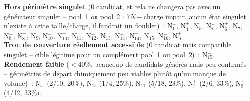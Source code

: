 \textbf{Hors p\'erim\`etre singulet} (0 candidat, et cela ne changera pas avec un g\'en\'erateur singulet -- pool~1 ou pool~2 : $7N-\mathrm{charge}$ impair, aucun \'etat singulet n'existe \`a cette taille/charge, il faudrait un doublet)~: N$_{4}^{-}$, N$_{4}^{+}$, N$_{5}$, N$_{6}^{-}$, N$_{6}^{+}$, N$_{7}$, N$_{8}^{-}$, N$_{8}^{+}$, N$_{9}$, N$_{10}^{-}$, N$_{10}^{+}$, N$_{11}$, N$_{12}^{-}$, N$_{13}$, N$_{14}^{-}$, N$_{14}^{+}$, N$_{15}$, N$_{16}^{-}$, N$_{16}^{+}$.\\[4pt]\textbf{Trou de couverture r\'eellement accessible} (0 candidat mais compatible singulet -- cible l\'egitime pour un compl\'ement pool~1 ou pool~2)~: N$_{15}^{-}$.\\[4pt]\textbf{Rendement faible} ($<$40\%, beaucoup de candidats g\'en\'er\'es mais peu confirm\'es -- g\'eom\'etries de d\'epart chimiquement peu viables plut\^ot qu'un manque de volume)~: N$_{5}^{-}$ (2/10, 20\%), N$_{13}^{-}$ (1/4, 25\%), N$_{11}^{-}$ (5/18, 28\%), N$_{7}^{+}$ (2/6, 33\%), N$_{9}^{+}$ (4/12, 33\%).